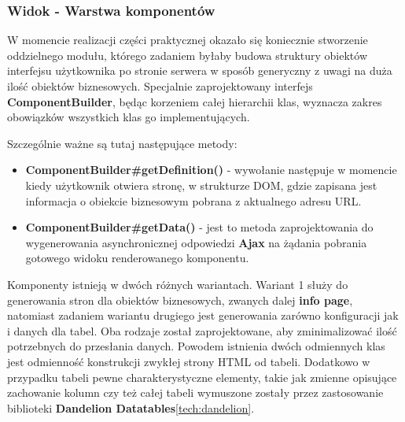 		\subsubsection{Widok - Warstwa komponentów}
			W momencie realizacji części praktycznej okazało się koniecznie stworzenie oddzielnego modułu, 
			którego zadaniem byłaby budowa struktury obiektów interfejsu użytkownika po stronie serwera w
			sposób generyczny z uwagi na duża ilość obiektów biznesowych. Specjalnie zaprojektowany interfejs
			\textbf{ComponentBuilder}, będąc korzeniem całej hierarchii klas, wyznacza zakres obowiązków 
			wszystkich klas go implementujących. 
			Szczególnie ważne są tutaj następujące metody:
			\begin{itemize}
				\item \textbf{ComponentBuilder\#{}getDefinition()} - wywołanie następuje w momencie kiedy użytkownik otwiera
				stronę, w strukturze DOM, gdzie zapisana jest informacja o obiekcie biznesowym pobrana z aktualnego adresu
				URL.
				\item \textbf{ComponentBuilder\#{}getData()} - jest to metoda zaprojektowania do wygenerowania
				asynchronicznej odpowiedzi \textbf{Ajax} na żądania pobrania gotowego widoku renderowanego komponentu.
			\end{itemize}
			
			Komponenty istnieją w dwóch różnych wariantach. Wariant 1 służy do generowania stron dla obiektów biznesowych, zwanych dalej \textbf{info page}, 
			natomiast zadaniem wariantu drugiego jest generowania zarówno konfiguracji jak i danych dla tabel. Oba rodzaje
			został zaprojektowane, aby zminimalizować ilość potrzebnych do przesłania danych. Powodem istnienia dwóch
			odmiennych klas jest odmienność konstrukcji zwykłej strony HTML od tabeli. Dodatkowo w przypadku tabeli pewne 
			charakterystyczne elementy, takie jak zmienne opisujące zachowanie kolumn czy też całej tabeli wymuszone 
			zostały przez zastosowanie biblioteki \textbf{Dandelion Datatables}\ref{tech:dandelion}. 
			

